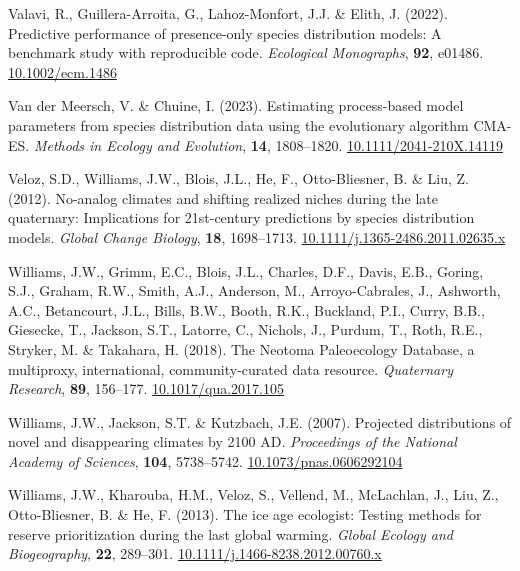 \documentclass[11pt,]{article}
\newlength{\cslhangindent}
\newenvironment{CSLReferences}[2] %
 {%
  \setlength{\parindent}{0pt}
  \ifodd #1 \everypar{\setlength{\hangindent}{\cslhangindent}}\ignorespaces\fi
  \ifnum #2 > 0
  \setlength{\parskip}{#2\baselineskip}
  \fi
 }%
 {}
\begin{document}
\begin{CSLReferences}{1}{0}
\leavevmode{}%
Valavi, R., Guillera-Arroita, G., Lahoz-Monfort, J.J. \& Elith, J.
(2022). Predictive performance of presence-only species distribution
models: A benchmark study with reproducible code. \emph{Ecological
Monographs}, \textbf{92}, e01486.
\href{https://doi.org/10.1002/ecm.1486}{10.1002/ecm.1486}

\leavevmode{}%
Van der Meersch, V. \& Chuine, I. (2023). Estimating process-based model
parameters from species distribution data using the evolutionary
algorithm {CMA}-{ES}. \emph{Methods in Ecology and Evolution},
\textbf{14}, 1808--1820.
\href{https://doi.org/10.1111/2041-210X.14119}{10.1111/2041-210X.14119}

\leavevmode{}%
Veloz, S.D., Williams, J.W., Blois, J.L., He, F., Otto-Bliesner, B. \&
Liu, Z. (2012). No-analog climates and shifting realized niches during
the late quaternary: Implications for 21st-century predictions by
species distribution models. \emph{Global Change Biology}, \textbf{18},
1698--1713.
\href{https://doi.org/10.1111/j.1365-2486.2011.02635.x}{10.1111/j.1365-2486.2011.02635.x}

\leavevmode{}%
Williams, J.W., Grimm, E.C., Blois, J.L., Charles, D.F., Davis, E.B.,
Goring, S.J., Graham, R.W., Smith, A.J., Anderson, M., Arroyo-Cabrales,
J., Ashworth, A.C., Betancourt, J.L., Bills, B.W., Booth, R.K.,
Buckland, P.I., Curry, B.B., Giesecke, T., Jackson, S.T., Latorre, C.,
Nichols, J., Purdum, T., Roth, R.E., Stryker, M. \& Takahara, H. (2018).
The {Neotoma} {Paleoecology} {Database}, a multiproxy, international,
community-curated data resource. \emph{Quaternary Research},
\textbf{89}, 156--177.
\href{https://doi.org/10.1017/qua.2017.105}{10.1017/qua.2017.105}

\leavevmode{}%
Williams, J.W., Jackson, S.T. \& Kutzbach, J.E. (2007). Projected
distributions of novel and disappearing climates by 2100 {AD}.
\emph{Proceedings of the National Academy of Sciences}, \textbf{104},
5738--5742.
\href{https://doi.org/10.1073/pnas.0606292104}{10.1073/pnas.0606292104}

\leavevmode{}%
Williams, J.W., Kharouba, H.M., Veloz, S., Vellend, M., McLachlan, J.,
Liu, Z., Otto-Bliesner, B. \& He, F. (2013). The ice age ecologist:
Testing methods for reserve prioritization during the last global
warming. \emph{Global Ecology and Biogeography}, \textbf{22}, 289--301.
\href{https://doi.org/10.1111/j.1466-8238.2012.00760.x}{10.1111/j.1466-8238.2012.00760.x}


\end{CSLReferences}
\end{document}
